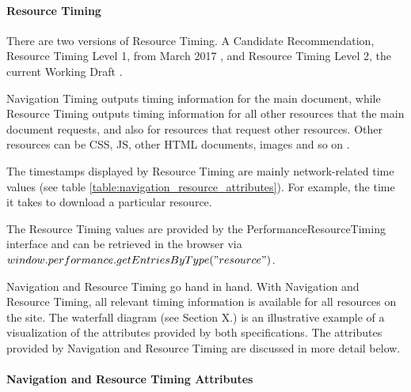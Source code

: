 
\paragraph{Resource Timing} %


There are two versions of Resource Timing.
A Candidate Recommendation, Resource Timing Level 1, from March 2017 \cite{2017W3CResourceTimingLevel1},
and Resource Timing Level 2, the current Working Draft \cite{2021W3CResourceTimingLevel2}.

Navigation Timing outputs timing information for the main document, while Resource Timing outputs timing information for all other resources that the main document requests, and also for resources that request other resources.
Other resources can be CSS, JS, other HTML documents, images and so on  \cite{2021W3CResourceTimingLevel2}.

The timestamps displayed by Resource Timing are mainly network-related time values (see table \ref{table:navigation_resource_attributes}).
For example, the time it takes to download a particular resource.


The Resource Timing values are provided by the PerformanceResourceTiming interface and can be retrieved in the browser via $window.performance.getEntriesByType("resource")$.



Navigation and Resource Timing go hand in hand.
With Navigation and Resource Timing, all relevant timing information is available for all resources on the site.
The waterfall diagram (see Section X.) is an illustrative example of a visualization of the attributes provided by both specifications.
The attributes provided by Navigation and Resource Timing are discussed in more detail below.



\paragraph{Navigation and Resource Timing Attributes} %

